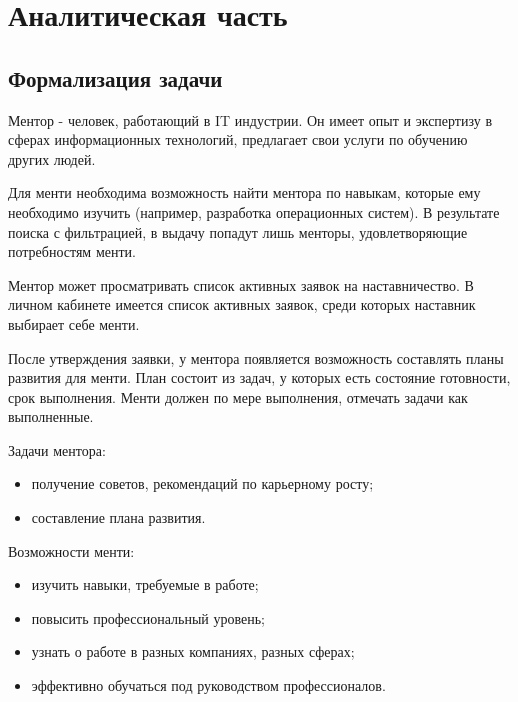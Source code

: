 \chapter{Аналитическая часть}
%

\section{Формализация задачи}

Ментор - человек, работающий в IT индустрии. Он имеет опыт и экспертизу в сферах информационных технологий, предлагает свои услуги по обучению других людей.

Для менти необходима возможность найти ментора по навыкам, которые ему необходимо изучить (например, разработка операционных систем). В результате поиска с фильтрацией, в выдачу попадут лишь менторы, удовлетворяющие потребностям менти.

Ментор может просматривать список активных заявок на наставничество.
В личном кабинете имеется список активных заявок, среди которых наставник выбирает себе менти.


После утверждения заявки, у ментора появляется возможность составлять планы развития для менти.
План состоит из задач, у которых есть состояние готовности, срок выполнения.
Менти должен по мере выполнения, отмечать задачи как выполненные.
%

Задачи ментора:
\begin{itemize}
    \item получение советов, рекомендаций по карьерному росту;
    \item составление плана развития.
\end{itemize}

Возможности менти:
\begin{itemize}
    \item изучить навыки, требуемые в работе;
    \item повысить профессиональный уровень;
    \item узнать о работе в разных компаниях, разных сферах;
    \item эффективно обучаться под руководством профессионалов.
\end{itemize}

